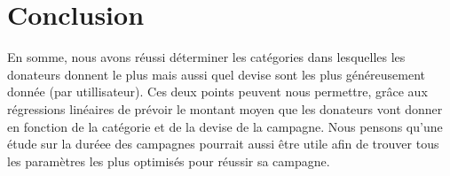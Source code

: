 \documentclass{article}
\begin{document}
\section{Conclusion}
\label{Conclusion}
\tabto{1cm} En somme, nous avons réussi déterminer les catégories dans lesquelles les donateurs donnent le plus mais aussi quel devise sont les plus généreusement donnée (par utillisateur). Ces deux points peuvent nous permettre, grâce aux régressions linéaires de prévoir le montant moyen que les donateurs vont 
donner en fonction de la catégorie et de la devise de la campagne. Nous pensons qu'une étude sur la duréee des campagnes pourrait aussi être utile afin de trouver tous les paramètres les plus optimisés pour réussir sa campagne. 
\end{document}
